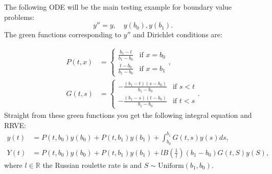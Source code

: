 \documentclass[a4paper,12pt]{article}
\begin{document}
\begin{example}[Dirichlet $y''=y$] \label{main dirichlet}
    The following ODE will be the main testing example for
    boundary value problems:
    \begin{equation} \label{eq:main dirichlet}
        y''=y, \quad y(b_{0}),y(b_{1}).
    \end{equation}
    The green functions corresponding to $y''$ and Dirichlet conditions are:

    \begin{align}
        P(t,x) & = \begin{cases}
                       \frac{b_{1}-t}{b_{1}-b_{0}} & \text{if } x = b_{0} \\
                       \frac{t-b_{0}}{b_{1}-b_{0}} & \text{if } x = b_{1}
                   \end{cases},       \\
        G(t,s) & = \begin{cases}
                       -\frac{(b_{1}-t)(s-b_{0})}{b_{1}-b_{0}} & \text{if } s<t \\
                       -\frac{(b_{1}-s)(t-b_{0})}{b_{1}-b_{0}} & \text{if } t<s
                   \end{cases}.
    \end{align}
    Straight from these green functions you get the following integral equation and RRVE:
    \begin{align} \label{inteq:main dirichlet}
        y(t) & = P(t,b_{0}) y(b_{0}) + P(t,b_{1}) y(b_{1}) +
        \int_{b_{0}}^{b_{1}} G(t,s)y(s) ds,                  \\
        Y(t) & = P(t,b_{0}) y(b_{0}) + P(t,b_{1}) y(b_{1})
        + l B\left(\frac{1}{l} \right)(b_{1}-b_{0}) G(t,S)y(S) , \label{RRVE:main dirichlet}
    \end{align}
    where $l \in \mathbb{R}$ the Russian roulette rate is and
    $S \sim \text{Uniform}(b_{1},b_{0})$.

\end{example}
\end{document}
